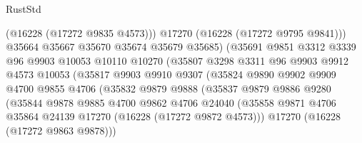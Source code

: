 \begin{lexlean}{RustStd}
\begin{coremodule}
                                  (@16228 (@17272 @9835 @4573)))
                                @17270
                                (@16228 (@17272 @9795 @9841)))
                              @35664
                              @35667
                              @35670
                              @35674
                              @35679
                              @35685)
                            (@35691
                              @9851
                              @3312
                              @3339
                              @96
                              @9903
                              @10053
                              @10110
                              @10270
                              (@35807
                                @3298
                                @3311
                                @96
                                @9903
                                @9912
                                @4573
                                @10053
                                (@35817
                                  @9903
                                  @9910
                                  @9307
                                  (@35824
                                    @9890
                                    @9902
                                    @9909
                                    @4700
                                    @9855
                                    @4706
                                    (@35832
                                      @9879
                                      @9888
                                      (@35837
                                        @9879
                                        @9886
                                        @9280
                                        (@35844
                                          @9878
                                          @9885
                                          @4700
                                          @9862
                                          @4706
                                          @24040
                                          (@35858
                                            @9871
                                            @4706
                                            @35864
                                            @24139
                                            @17270
                                            (@16228 (@17272 @9872 @4573)))
                                          @17270
                                          (@16228 (@17272 @9863 @9878)))

\end{coremodule}
\end{lexlean}
